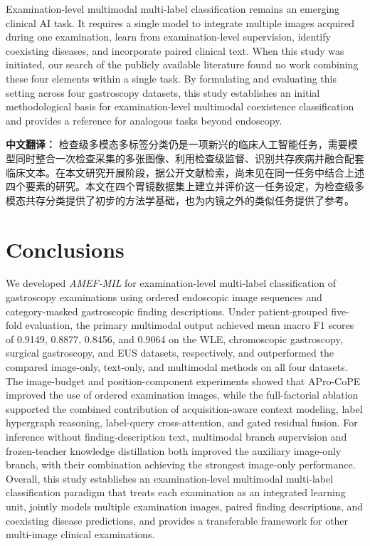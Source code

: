 \documentclass[Afour,sagev,times]{sagej}
\begin{document}
Examination-level multimodal multi-label classification remains an emerging clinical AI task. It requires a single model to integrate multiple images acquired during one examination, learn from examination-level supervision, identify coexisting diseases, and incorporate paired clinical text. When this study was initiated, our search of the publicly available literature found no work combining these four elements within a single task. By formulating and evaluating this setting across four gastroscopy datasets, this study establishes an initial methodological basis for examination-level multimodal coexistence classification and provides a reference for analogous tasks beyond endoscopy.

\textbf{中文翻译：} 检查级多模态多标签分类仍是一项新兴的临床人工智能任务，需要模型同时整合一次检查采集的多张图像、利用检查级监督、识别共存疾病并融合配套临床文本。在本文研究开展阶段，据公开文献检索，尚未见在同一任务中结合上述四个要素的研究。本文在四个胃镜数据集上建立并评价这一任务设定，为检查级多模态共存分类提供了初步的方法学基础，也为内镜之外的类似任务提供了参考。

\section{Conclusions}

We developed \textit{AMEF-MIL} for examination-level multi-label classification of gastroscopy examinations using ordered endoscopic image sequences and category-masked gastroscopic finding descriptions. Under patient-grouped five-fold evaluation, the primary multimodal output achieved mean macro F1 scores of 0.9149, 0.8877, 0.8456, and 0.9064 on the WLE, chromoscopic gastroscopy, surgical gastroscopy, and EUS datasets, respectively, and outperformed the compared image-only, text-only, and multimodal methods on all four datasets. The image-budget and position-component experiments showed that APro-CoPE improved the use of ordered examination images, while the full-factorial ablation supported the combined contribution of acquisition-aware context modeling, label hypergraph reasoning, label-query cross-attention, and gated residual fusion. For inference without finding-description text, multimodal branch supervision and frozen-teacher knowledge distillation both improved the auxiliary image-only branch, with their combination achieving the strongest image-only performance. Overall, this study establishes an examination-level multimodal multi-label classification paradigm that treats each examination as an integrated learning unit, jointly models multiple examination images, paired finding descriptions, and coexisting disease predictions, and provides a transferable framework for other multi-image clinical examinations.
\end{document}
